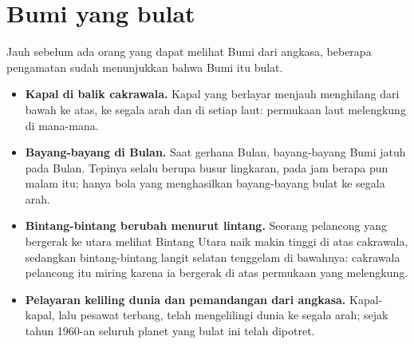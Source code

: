 \section{Bumi yang bulat}

Jauh sebelum ada orang yang dapat melihat Bumi dari angkasa, beberapa
pengamatan sudah menunjukkan bahwa Bumi itu bulat.
\begin{itemize}
  \item \textbf{Kapal di balik cakrawala.} Kapal yang berlayar menjauh
        menghilang dari bawah ke atas, ke segala arah dan di setiap laut:
        permukaan laut melengkung di mana-mana.
  \item \textbf{Bayang-bayang di Bulan.} Saat gerhana Bulan, bayang-bayang
        Bumi jatuh pada Bulan. Tepinya selalu berupa busur lingkaran, pada jam
        berapa pun malam itu; hanya bola yang menghasilkan bayang-bayang bulat
        ke segala arah.
  \item \textbf{Bintang-bintang berubah menurut lintang.} Seorang pelancong
        yang bergerak ke utara melihat Bintang Utara naik makin tinggi di atas
        cakrawala, sedangkan bintang-bintang langit selatan tenggelam di
        bawahnya: cakrawala pelancong itu miring karena ia bergerak di atas
        permukaan yang melengkung.
  \item \textbf{Pelayaran keliling dunia dan pemandangan dari angkasa.}
        Kapal-kapal, lalu pesawat terbang, telah mengelilingi dunia ke segala
        arah; sejak tahun 1960-an seluruh planet yang bulat ini telah dipotret.
\end{itemize}


